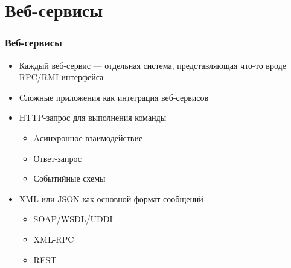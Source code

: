 \documentclass[xetex,mathserif,serif]{beamer}
\begin{document}
    \section{Веб-сервисы}

    \begin{frame}
        \frametitle{Веб-сервисы}
        \begin{itemize}
            \item Каждый веб-сервис --- отдельная система, представляющая что-то вроде RPC/RMI интерфейса
            \item Cложные приложения как интеграция веб-сервисов
            \item HTTP-запрос для выполнения команды
            \begin{itemize}
                \item Aсинхронное взаимодействие
                \item Ответ-запрос
                \item Событийные схемы
            \end{itemize}
            \item XML или JSON как основной формат сообщений
            \begin{itemize}
                \item SOAP/WSDL/UDDI
                \item XML-RPC
                \item REST
            \end{itemize}
        \end{itemize}
    \end{frame}
\end{document}
